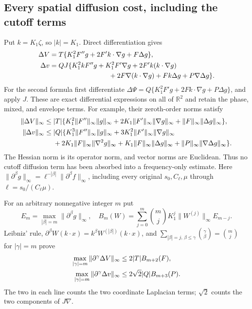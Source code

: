 \subsection{Every spatial diffusion cost, including the cutoff terms}
Put $k=K_1\zeta$, so $|k|=K_1$. Direct differentiation gives
\begin{align}
 \Delta V={}&T\{K_1^2F''g+2F'k\cdot\nabla g+F\Delta g\},
 \label{eq:lapV}\\
 \Delta v={}&QJ\{K_1^2kF''g+K_1^2F'\nabla g
 +2F'k(k\cdot\nabla g)\notag\\
 &\hspace{26mm}+2F\nabla(k\cdot\nabla g)
 +Fk\Delta g+P\nabla\Delta g\}.
 \label{eq:lapv}
\end{align}
For the second formula first differentiate
$\Delta\Psi=Q\{K_1^2F'g+2F k\cdot\nabla g+P\Delta g\}$,
and apply $J$. These are exact differential expressions on all
of $\mathbb R^2$ and retain the phase, mixed, and envelope terms.
For example, their zeroth-order norms satisfy
\begin{align}
 \|\Delta V\|_\infty\leq{}&|T|\{
 K_1^2\|F''\|_\infty\|g\|_\infty
 +2K_1\|F'\|_\infty\|\nabla g\|_\infty
 +\|F\|_\infty\|\Delta g\|_\infty\},\notag\\
 \|\Delta v\|_\infty\leq{}&|Q|\{
 K_1^3\|F''\|_\infty\|g\|_\infty
 +3K_1^2\|F'\|_\infty\|\nabla g\|_\infty\notag\\
 &+2K_1\|F\|_\infty\|\nabla^2g\|_\infty
 +K_1\|F\|_\infty\|\Delta g\|_\infty
 +\|P\|_\infty\|\nabla\Delta g\|_\infty\}.
 \label{eq:zerocosts}
\end{align}
The Hessian norm is its operator norm, and vector norms are Euclidean.
Thus no cutoff diffusion term has been absorbed into a frequency-only
estimate. Here $\|\partial^\beta g\|_\infty
=\ell^{-|\beta|}\|\partial^\beta f\|_\infty$, including every
original $s_0,C_\ell,\mu$ through $\ell=s_0/(C_\ell\mu)$.

For an arbitrary nonnegative integer $m$ put
\[
 E_m=\max_{|\beta|=m}\|\partial^\beta g\|_\infty,
 \quad B_m(W)=\sum_{j=0}^m\binom mj
 K_1^j\|W^{(j)}\|_\infty E_{m-j}.
\]
Leibniz' rule, $\partial^\beta W(k\cdot x)=k^\beta
W^{(|\beta|)}(k\cdot x)$, and
$\sum_{|\beta|=j,\,\beta\leq\gamma}\binom\gamma\beta
=\binom mj$ for $|\gamma|=m$ prove
\begin{align}
 \max_{|\gamma|=m}\|\partial^\gamma\Delta V\|_\infty
 &\leq2|T|B_{m+2}(F),\notag\\
 \max_{|\gamma|=m}\|\partial^\gamma\Delta v\|_\infty
 &\leq2\sqrt2|Q|B_{m+3}(P).
 \label{eq:allspacecosts}
\end{align}
The two in each line counts the two coordinate Laplacian terms;
$\sqrt2$ counts the two components of $J\nabla$.

